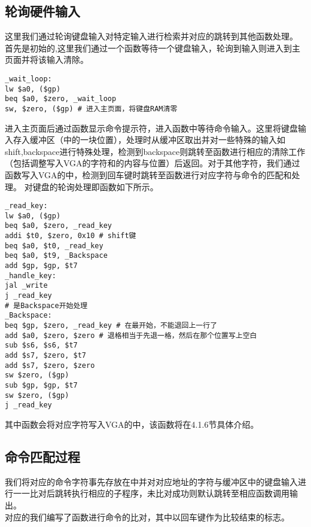 \subsection{轮询硬件输入}
\songti
\hspace*{5mm}这里我们通过轮询键盘输入对特定输入进行检索并对应的跳转到其他函数处理。
\kaishu
\hspace*{5mm}首先是初始的,这里我们通过一个函数等待一个键盘输入，轮询到输入则进入到主页面并将该输入清除。
\begin{lstlisting}[style=assembler-style, caption={Wait for a key to continue}]
_wait_loop:
lw $a0, ($gp)
beq $a0, $zero, _wait_loop
sw, $zero, ($gp) # 进入主页面，将键盘RAM清零
\end{lstlisting}
\hspace*{5mm}进入主页面后通过函数显示命令提示符，进入函数中等待命令输入。这里将键盘输入存入缓冲区（中的一块位置），处理时从缓冲区取出并对一些特殊的输入如shift,backspace进行特殊处理，检测到backspace则跳转至函数进行相应的清除工作（包括调整写入VGA的字符和的内容与位置）后返回。对于其他字符，我们通过函数写入VGA的中，检测到回车键时跳转至函数进行对应字符与命令的匹配和处理。
\hspace*{5mm}对键盘的轮询处理即函数如下所示。
\begin{lstlisting}[style=assembler-style, caption={Read and handle the key}]
_read_key:
lw $a0, ($gp)
beq $a0, $zero, _read_key
addi $t0, $zero, 0x10 # shift键
beq $a0, $t0, _read_key
beq $a0, $t9, _Backspace
add $gp, $gp, $t7
_handle_key:
jal _write
j _read_key
# 是Backspace开始处理
_Backspace:
beq $gp, $zero, _read_key # 在最开始，不能退回上一行了
add $a0, $zero, $zero # 退格相当于先退一格，然后在那个位置写上空白
sub $s6, $s6, $t7
add $s7, $zero, $t7
add $s7, $zero, $zero
sw $zero, ($gp)
sub $gp, $gp, $t7
sw $zero, ($gp)
j _read_key
\end{lstlisting}
\hspace*{5mm}其中函数会将对应字符写入VGA的中，该函数将在4.1.6节具体介绍。
\subsection{命令匹配过程}
\songti
\hspace*{5mm}我们将对应的命令字符事先存放在中并对对应地址的字符与缓冲区中的键盘输入进行一一比对后跳转执行相应的子程序，未比对成功则默认跳转至相应函数调用输出。
\\\kaishu
\hspace*{5mm}对应的我们编写了函数进行命令的比对，其中以回车键作为比较结束的标志。
